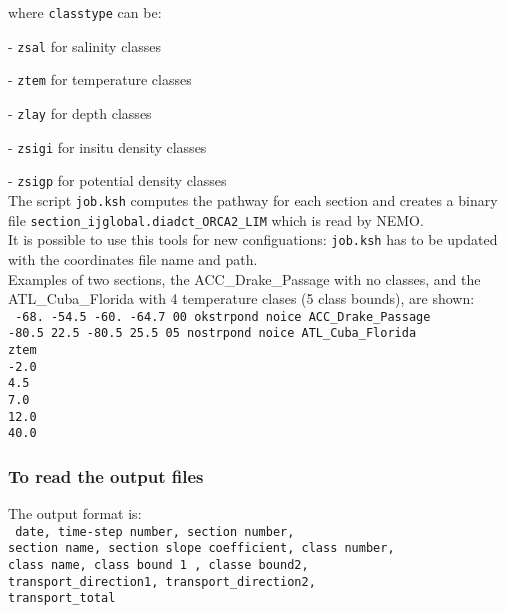 \documentclass[../main/NEMO_manual]{subfiles}
\begin{document}
\noindent where \texttt{classtype} can be:

 - \texttt{zsal}  for          salinity classes

 - \texttt{ztem}  for       temperature classes

 - \texttt{zlay}  for             depth classes

 - \texttt{zsigi} for    insitu density classes

 - \texttt{zsigp} for potential density classes \\
  
 The script \texttt{job.ksh} computes the pathway for each section and creates a binary file
 \texttt{section\_ijglobal.diadct\_ORCA2\_LIM} which is read by NEMO. \\

 It is possible to use this tools for new configuations: \texttt{job.ksh} has to be updated with
 the coordinates file name and path. \\

 Examples of two sections, the ACC\_Drake\_Passage with no classes,
 and the ATL\_Cuba\_Florida with 4 temperature clases (5 class bounds), are shown: \\
 \noindent
 {\scriptsize
   \texttt{
     -68.    -54.5   -60.    -64.7  00 okstrpond noice ACC\_Drake\_Passage \\
     -80.5    22.5   -80.5    25.5  05 nostrpond noice ATL\_Cuba\_Florida  \\
     ztem                                                                  \\
     -2.0                                                                  \\
     4.5                                                                  \\
     7.0                                                                  \\
     12.0                                                                  \\
     40.0}
 }

\subsubsection{To read the output files}

The output format is: \\
{\scriptsize
  \texttt{
    date, time-step number, section number,                \\
    section name, section slope coefficient, class number, \\
    class name, class bound 1 , classe bound2,             \\
    transport\_direction1, transport\_direction2,          \\
    transport\_total}
}                                     \\
\end{document}
